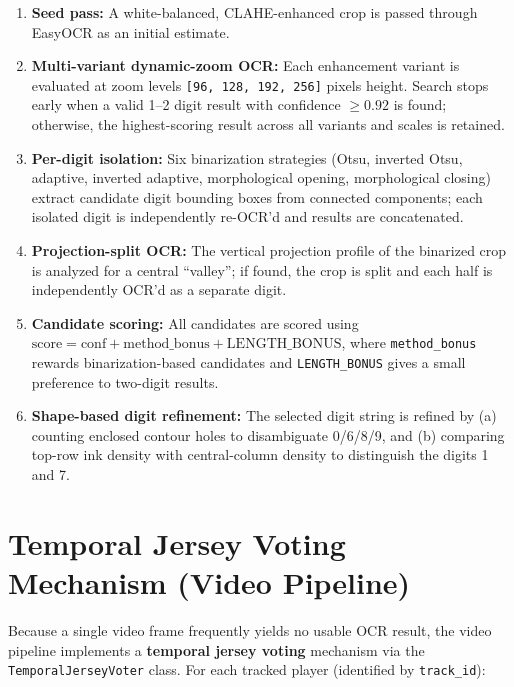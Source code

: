 \begin{enumerate}
    \item \textbf{Seed pass:} A white-balanced, CLAHE-enhanced crop is
    passed through EasyOCR as an initial estimate.

    \item \textbf{Multi-variant dynamic-zoom OCR:} Each enhancement
    variant is evaluated at zoom levels
    \texttt{[96, 128, 192, 256]} pixels height. Search stops early when
    a valid 1--2 digit result with confidence $\geq 0.92$ is found;
    otherwise, the highest-scoring result across all variants and scales
    is retained.

    \item \textbf{Per-digit isolation:} Six binarization strategies
    (Otsu, inverted Otsu, adaptive, inverted adaptive, morphological
    opening, morphological closing) extract candidate digit bounding
    boxes from connected components; each isolated digit is
    independently re-OCR'd and results are concatenated.

    \item \textbf{Projection-split OCR:} The vertical projection profile
    of the binarized crop is analyzed for a central ``valley''; if
    found, the crop is split and each half is independently OCR'd as a
    separate digit.

    \item \textbf{Candidate scoring:} All candidates are scored using
    $\text{score} = \text{conf} + \text{method\_bonus} +
    \text{LENGTH\_BONUS}$, where \texttt{method\_bonus} rewards
    binarization-based candidates and \texttt{LENGTH\_BONUS} gives a
    small preference to two-digit results.

    \item \textbf{Shape-based digit refinement:} The selected digit
    string is refined by (a) counting enclosed contour holes to
    disambiguate 0/6/8/9, and (b) comparing top-row ink density with
    central-column density to distinguish the digits 1 and 7.
\end{enumerate}

\section{Temporal Jersey Voting Mechanism (Video Pipeline)}
\label{sec:temporal-voting}

Because a single video frame frequently yields no usable OCR result,
the video pipeline implements a \textbf{temporal jersey voting} mechanism
via the \texttt{Temporal\-Jersey\-Voter} class. For each tracked player
(identified by \texttt{track\_id}):


